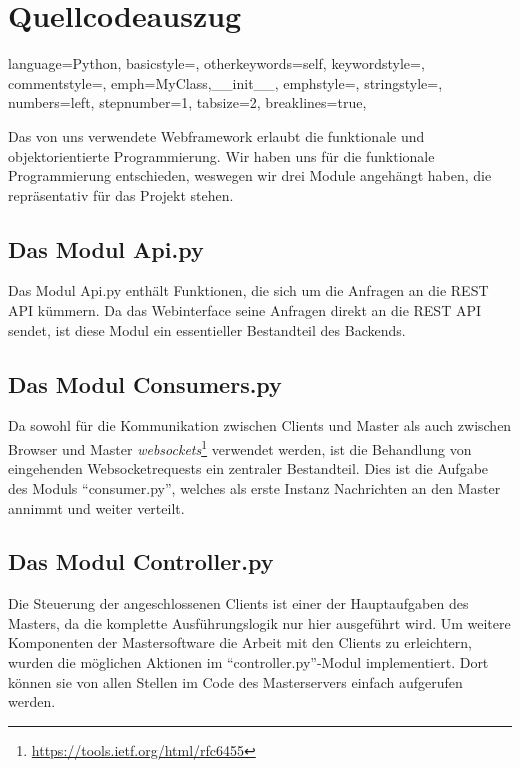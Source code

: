 \section{Quellcodeauszug}


\lstset
{
    language=Python,
    basicstyle=\footnotesize,
    otherkeywords={self},             %
    keywordstyle=\color{deepblue},
    commentstyle=\color{string-color},
    emph={MyClass,__init__},          %
    emphstyle=\color{deepred},    %
    stringstyle=\color{deepgreen},
    numbers=left,
    stepnumber=1,
    tabsize=2,
    breaklines=true,
}

Das von uns verwendete Webframework erlaubt die funktionale und objektorientierte Programmierung. Wir haben uns für die funktionale Programmierung
entschieden, weswegen wir drei Module angehängt haben, die repräsentativ für das Projekt stehen.

\subsection{Das Modul Api.py}
Das Modul Api.py enthält Funktionen, die sich um die Anfragen an die REST API kümmern.
Da das Webinterface seine Anfragen direkt an die REST API sendet, ist diese Modul ein essentieller
Bestandteil des Backends.


\subsection{Das Modul Consumers.py}
Da sowohl für die Kommunikation zwischen Clients und Master als auch zwischen Browser und
Master \textit{websockets}\footnote{\url{https://tools.ietf.org/html/rfc6455}} verwendet werden,
ist die Behandlung von eingehenden Websocketrequests ein zentraler Bestandteil. Dies ist die
Aufgabe des Moduls "`consumer.py"', welches als erste Instanz Nachrichten an den Master annimmt und
weiter verteilt.



\subsection{Das Modul Controller.py}
Die Steuerung der angeschlossenen Clients ist einer der Hauptaufgaben des Masters, da die komplette
Ausführungslogik nur hier ausgeführt wird. Um weitere Komponenten der Mastersoftware die Arbeit mit den
Clients zu erleichtern, wurden die möglichen Aktionen im "`controller.py"'-Modul implementiert. Dort können
sie von allen Stellen im Code des Masterservers einfach aufgerufen werden.


